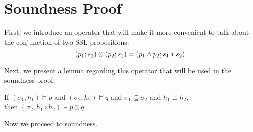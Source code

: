 \section{Soundness Proof}
\label{sec:soundness-proof}

First, we introduce an operator that will make it more convenient to talk about the conjunction of two SSL propositions:
\[
  (p_1 ; s_1) \otimes (p_2 ; s_2) = (p_1 \land p_2 ; s_1 * s_2)
\]

\noindent
Next, we present a lemma regarding this operator that will be used in the soundness proof:
\begin{lemma}\label{thm:otimes-entail}
  If $(\sigma_1, h_1) \models p$ and $(\sigma_2, h_2) \models q$ and $\sigma_1 \subseteq \sigma_2$ and $h_1 \mathbin{\bot} h_2$,\\
  then $(\sigma_2, h_1 \circ h_2) \models p \otimes q$
\end{lemma}

\noindent
Now we proceed to soundness.

\soundnessThm*


